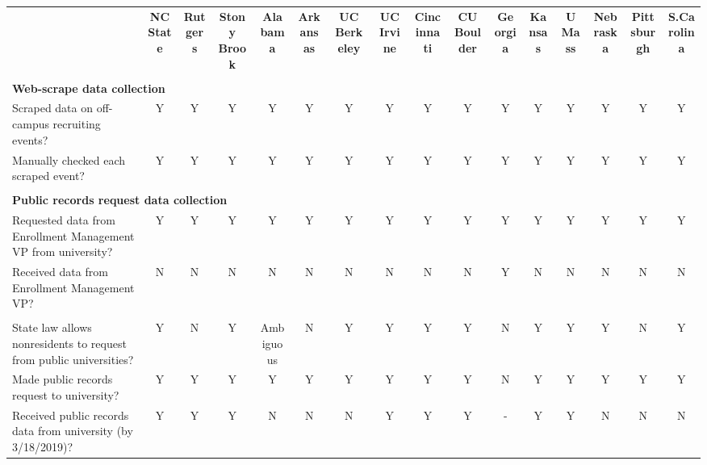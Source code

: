 \begin{tabular*}{\linewidth}{@{\extracolsep{\fill} } lccccccccccccccc}%
&\multirow{2}{0.3in}{\centering\bfseries NC State}&\multirow{2}{0.3in}{\centering\bfseries Rutgers}&\multirow{2}{0.3in}{\centering\bfseries Stony Brook}&\multirow{2}{0.3in}{\centering\bfseries Alabama}&\multirow{2}{0.3in}{\centering\bfseries Arkansas}&\multirow{2}{0.3in}{\centering\bfseries UC Berkeley}&\multirow{2}{0.3in}{\centering\bfseries UC Irvine}&\multirow{2}{0.3in}{\centering\bfseries Cincinnati}&\multirow{2}{0.3in}{\centering\bfseries CU Boulder}&\multirow{2}{0.3in}{\centering\bfseries Georgia}&\multirow{2}{0.3in}{\centering\bfseries Kansas}&\multirow{2}{0.3in}{\centering\bfseries UMass}&\multirow{2}{0.3in}{\centering\bfseries Nebraska}&\multirow{2}{0.3in}{\centering\bfseries Pittsburgh}&\multirow{2}{0.3in}{\centering\bfseries S.Carolina}\\%
&&&&&&&&&&&&&&&\\%
\hline%
&&&&&&&&&&&&&&&\\%
\multicolumn{16}{l}{\bfseries Web-scrape data collection}\\%
\hspace{0.2cm} Scraped data on off-campus recruiting events?&Y&Y&Y&Y&Y&Y&Y&Y&Y&Y&Y&Y&Y&Y&Y\\%
\hspace{0.2cm} Manually checked each scraped event?&Y&Y&Y&Y&Y&Y&Y&Y&Y&Y&Y&Y&Y&Y&Y\\%
&&&&&&&&&&&&&&&\\%
\multicolumn{16}{l}{\bfseries Public records request data collection}\\%
\hspace{0.2cm} Requested data from Enrollment Management VP from university?&Y&Y&Y&Y&Y&Y&Y&Y&Y&Y&Y&Y&Y&Y&Y\\%
\hspace{0.2cm} Received data from Enrollment Management VP?&N&N&N&N&N&N&N&N&N&Y&N&N&N&N&N\\%
&&&&&&&&&&&&&&&\\%
\hspace{0.2cm} State law allows nonresidents to request from public universities?&Y&N&Y&Ambiguous&N&Y&Y&Y&Y&N&Y&Y&Y&N&Y\\%
\hspace{0.2cm} Made public records request to university?&Y&Y&Y&Y&Y&Y&Y&Y&Y&N&Y&Y&Y&Y&Y\\%
\hspace{0.2cm} Received public records data from university (by 3/18/2019)?&Y&Y&Y&N&N&N&Y&Y&Y&{-}&Y&Y&N&N&N\\%

\end{tabular*}
